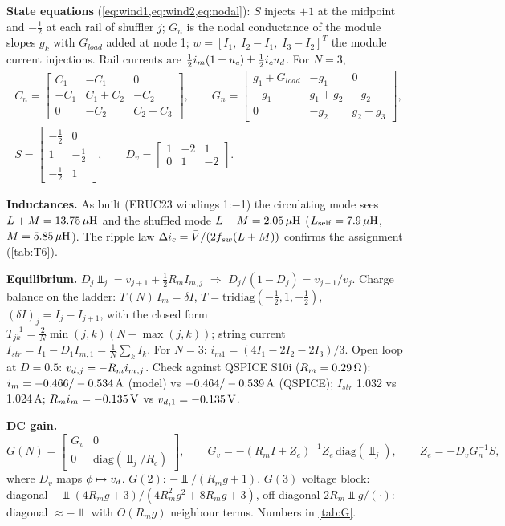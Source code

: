 \textbf{State equations} (\cref{eq:wind1,eq:wind2,eq:nodal}): $S$ injects $+1$ at the midpoint and $-\tfrac12$ at each rail of shuffler $j$; $G_n$ is the nodal conductance of the module slopes $g_k$ with $G_{load}$ added at node 1; $w = [I_1,\; I_2 - I_1,\; I_3 - I_2]^T$ the module current injections. Rail currents are $\tfrac12\im(1\pm\uc) \pm \tfrac12\ic\ud$. For $N = 3$,
\begin{gather*}
  C_n = \begin{bmatrix} C_1 & -C_1 & 0\\ -C_1 & C_1{+}C_2 & -C_2\\ 0 & -C_2 & C_2{+}C_3\end{bmatrix},\qquad
  G_n = \begin{bmatrix} g_1{+}G_{load} & -g_1 & 0\\ -g_1 & g_1{+}g_2 & -g_2\\ 0 & -g_2 & g_2{+}g_3\end{bmatrix},\\[4pt]
  S = \begin{bmatrix} -\tfrac12 & 0\\ 1 & -\tfrac12\\ -\tfrac12 & 1\end{bmatrix},\qquad
  D_v = \begin{bmatrix} 1 & -2 & 1\\ 0 & 1 & -2\end{bmatrix}.
\end{gather*}

\textbf{Inductances.} As built (ERUC23 windings 1:$-$1) the circulating mode sees $L+M = 13.75\uH$ and the shuffled mode $L-M = 2.05\uH$ ($L_{\mathrm{self}} = 7.9\uH$, $M = 5.85\uH$). The ripple law $\Delta\ic = \Vbar/(2\fsw(L+M))$ confirms the assignment (\cref{tab:T6}).

\textbf{Equilibrium.} $D_j\Vbar_j = v_{j+1} + \tfrac12 R_m I_{m,j}$ $\Rightarrow$ $D_j/(1-D_j) = v_{j+1}/v_j$. Charge balance on the ladder: $T(N)\,I_m = \delta I$, $T = \mathrm{tridiag}(-\tfrac12, 1, -\tfrac12)$, $(\delta I)_j = I_j - I_{j+1}$, with the closed form $T^{-1}_{jk} = \tfrac{2}{N}\min(j,k)(N-\max(j,k))$; string current $I_{str} = I_1 - D_1 I_{m,1} = \tfrac1N\sum_k I_k$. For $N=3$: $i_{m1} = (4I_1 - 2I_2 - 2I_3)/3$. Open loop at $D = 0.5$: $\vd{}_{,j} = -R_m \im{}_{,j}$. Check against QSPICE S10i ($R_m = 0.29\ohm$): $\im = -0.466/-0.534\A$ (model) vs $-0.464/-0.539\A$ (QSPICE); $I_{str}$ 1.032 vs 1.024\,A; $R_m\im = -0.135\V$ vs $\vd{}_{,1} = -0.135\V$.

\textbf{DC gain.}
\begin{equation}
  G(N) = \begin{bmatrix} G_v & 0\\ 0 & \mathrm{diag}(\Vbar_j/R_c)\end{bmatrix},\qquad
  G_v = -(R_m I + Z_e)^{-1} Z_e\,\mathrm{diag}(\Vbar_j),\qquad Z_e = -D_v G_n^{-1} S,
\end{equation}
where $D_v$ maps $\phi \mapsto \vd$. $G(2)$: $-\Vbar/(R_m g + 1)$. $G(3)$ voltage block: diagonal $-\Vbar(4R_m g + 3)/(4R_m^2g^2 + 8R_m g + 3)$, off-diagonal $2R_m\Vbar{} g/(\cdot)$: diagonal $\approx -\Vbar$ with $O(R_m g)$ neighbour terms. Numbers in \cref{tab:G}.

